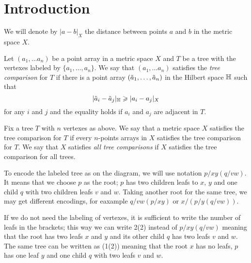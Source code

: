 \section{Introduction}\label{sec:intro}

We will denote by $|a-b|_X$ the distance between points $a$ and $b$ in the metric space $X$.

Let $(a_1,\dots a_n)$ be a point array in a metric space $X$ and $T$ be a 
tree with the vertexes labeled by $\{a_1,\dots,a_n\}$.
We say that $(a_1,\dots a_n)$  satisfies the \emph{tree comparison} for $T$ if there is a point array $(\~a_1,\dots, \~a_n)$ in the Hilbert space $\HH$ such that 
\[|\~a_i-\~a_j|_\HH\ge|a_i-a_j|_X\]
for any $i$ and $j$ and the equality holds if $a_i$ and $a_j$ are adjacent in $T$.

Fix a tree $T$ with $n$ vertexes as above.
We say that a metric space $X$ satisfies the tree comparison for $T$ if 
every $n$-points arrays in $X$ satisfies the tree comparison for $T$.
We say that  $X$ satisfies \emph{all tree comparisons}
if $X$ satisfies the tree comparison for all trees.

\hide
\begin{wrapfigure}{r}{15 mm}
\end{wrapfigure}
\unhide

To encode the labeled tree as on the diagram, we will use notation $p/xy(q/vw)$.
It means that we choose $p$ as the root; 
$p$ has two children leafs to $x$, $y$ and one child $q$ with two children leafs $v$ and $w$.
Taking another root for the same tree, we may get different encodings, for eaxample $q/vw(p/xy)$ or $x/(p/y(q/vw))$.

If we do not need the labeling of vertexes,
it is sufficient to write the number of leafs in the brackets;
this way we can write 2(2) instead of $p/xy(q/vw)$ meaning that the root has two leafs $x$ and $y$ and its other child $q$ has two leafs $v$ and $w$.  
The same tree can be written as (1(2)) meaning that the root $x$ has no leafs, $p$ has one leaf $y$ and one child $q$ with two leafs $v$ and $w$.


